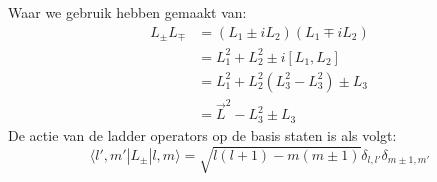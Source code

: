 Waar we gebruik hebben gemaakt van:
\begin{align*}
    L_\pm L_\mp
    &= \left(L_1 \pm i L_2\right) \left(L_1 \mp i L_2\right)\\
    &= L_1^2 + L_2^2 \pm i [L_1, L_2] \\
    &= L_1^2 + L_2^2 (L_3^2 - L_3^2) \pm L_3 \\
    &= \vec{L}^2 - L_3^2 \pm L_3
\end{align*}
De actie van de ladder operators op de basis staten is als volgt:
\[\langle l',m'| L_\pm |l,m \rangle = \sqrt{l(l+1) - m(m \pm 1)} \delta_{l,l'} \delta_{m\pm 1,m'}\]



